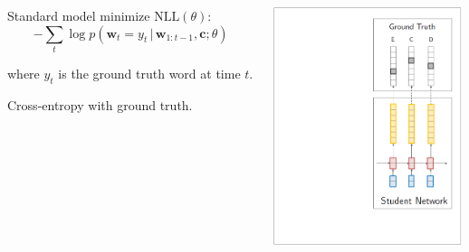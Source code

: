 \documentclass{beamer}
\newcommand{\air}{\vspace{0.25cm}}
\newcommand{\given}{\,|\,}
\newcommand{\wvec}{\mathbf{w}}
\newcommand{\cvec}{\mathbf{c}}
\begin{document}
\begin{frame}
\centerline{}
\air 


\begin{columns}
\begin{column}{6.5cm}
Standard model minimize $\text{NLL}(\theta)$: 
\air
$$-\sum_t \log p(\wvec_t=y_t \given \wvec_{1:t-1}, \cvec ; \theta)$$

where $y_t$ is the ground truth word at time $t$.

\air 

Cross-entropy with ground truth.

\end{column}
\begin{column}{5.5cm}
\includegraphics[width=5.5cm]{word-kd-0}
\end{column}
\end{columns}
\end{frame}

\end{document}
